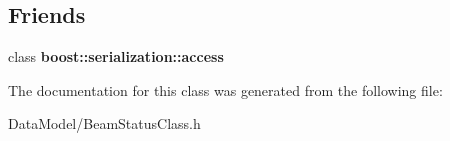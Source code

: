 \subsection*{Friends}
\begin{DoxyCompactItemize}
\item 
\hypertarget{classBeamStatusClass_ac98d07dd8f7b70e16ccb9a01abf56b9c}{
class {\bfseries boost::serialization::access}}
\label{classBeamStatusClass_ac98d07dd8f7b70e16ccb9a01abf56b9c}

\end{DoxyCompactItemize}


The documentation for this class was generated from the following file:\begin{DoxyCompactItemize}
\item 
DataModel/BeamStatusClass.h\end{DoxyCompactItemize}
